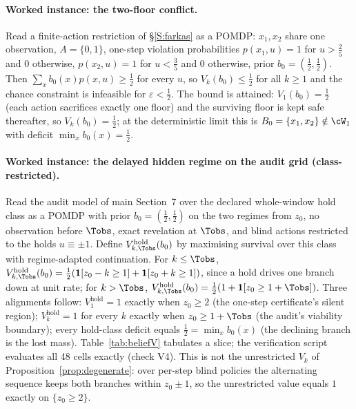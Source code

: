 \paragraph{Worked instance: the two-floor conflict.} Read a finite-action restriction of \S\ref{S:farkas} as a POMDP: $x_1,x_2$ share one observation, $A=\{0,1\}$, one-step violation probabilities $p(x_1,u)=1$ for $u>\tfrac25$ and $0$ otherwise, $p(x_2,u)=1$ for $u<\tfrac35$ and $0$ otherwise, prior $b_0=(\tfrac12,\tfrac12)$. Then $\sum_xb_0(x)p(x,u)\ge\tfrac12$ for every $u$, so $V_k(b_0)\le\tfrac12$ for all $k\ge1$ and the chance constraint is infeasible for $\varepsilon<\tfrac12$. The bound is attained: $V_1(b_0)=\tfrac12$ (each action sacrifices exactly one floor) and the surviving floor is kept safe thereafter, so $V_k(b_0)=\tfrac12$; at the deterministic limit this is $B_0=\{x_1,x_2\}\notin\cW_1$ with deficit $\min_xb_0(x)=\tfrac12$.

\paragraph{Worked instance: the delayed hidden regime on the audit grid (class-restricted).} Read the audit model of main Section~7 over the declared whole-window hold class as a POMDP with prior $b_0=(\tfrac12,\tfrac12)$ on the two regimes from $z_0$, no observation before $\Tobs$, exact revelation at $\Tobs$, and blind actions restricted to the holds $u\equiv\pm1$. Define $V^{\mathrm{hold}}_{k,\Tobs}(b_0)$ by maximising survival over this class with regime-adapted continuation. For $k\le\Tobs$, $V^{\mathrm{hold}}_{k,\Tobs}(b_0)=\tfrac12(\mathbf 1[z_0-k\ge1]+\mathbf 1[z_0+k\ge1])$, since a hold drives one branch down at unit rate; for $k>\Tobs$, $V^{\mathrm{hold}}_{k,\Tobs}(b_0)=\tfrac12(1+\mathbf 1[z_0\ge1+\Tobs])$. Three alignments follow: $V^{\mathrm{hold}}_1=1$ exactly when $z_0\ge2$ (the one-step certificate's silent region); $V^{\mathrm{hold}}_k=1$ for every $k$ exactly when $z_0\ge1+\Tobs$ (the audit's viability boundary); every hold-class deficit equals $\tfrac12=\min_xb_0(x)$ (the declining branch is the lost mass). Table~\ref{tab:beliefV} tabulates a slice; the verification script evaluates all 48 cells exactly (check V4). This is not the unrestricted $V_k$ of Proposition~\ref{prop:degenerate}: over per-step blind policies the alternating sequence keeps both branches within $z_0\pm1$, so the unrestricted value equals $1$ exactly on $\{z_0\ge2\}$.

